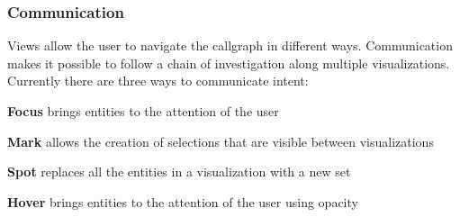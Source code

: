 \subsubsection{Communication}

Views allow the user to navigate the callgraph in different ways. Communication makes it possible to follow a chain of investigation along multiple visualizations. Currently there are three ways to communicate intent:

\textbf{Focus} brings entities to the attention of the user

\textbf{Mark} allows the creation of selections that are visible between visualizations

\textbf{Spot} replaces all the entities in a visualization with a new set

\textbf{Hover} brings entities to the attention of the user using opacity